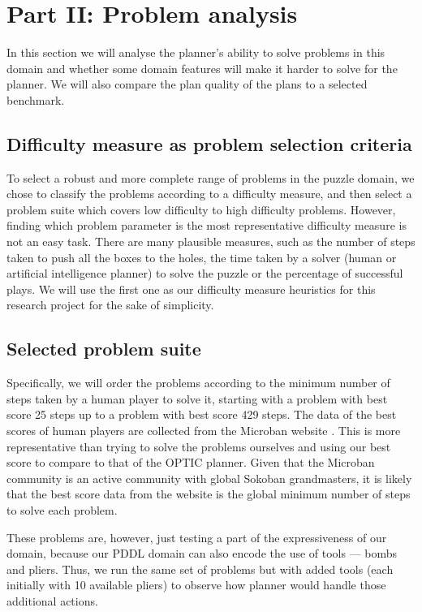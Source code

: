 \documentclass[letterpaper]{article} %
\begin{document}
\section{Part II: Problem analysis}
In this section we will analyse the planner's ability to solve problems in this domain and whether some domain features will
make it harder to solve for the planner. We will also compare the plan quality of the plans to a selected benchmark.

\subsection{Difficulty measure as problem selection criteria}
To select a robust and more complete range of problems in the puzzle domain, we chose to classify the problems according
 to a difficulty measure, and then select a problem suite which covers low difficulty to high difficulty problems. 
 However, finding which problem parameter is the most representative difficulty measure is not an easy task. There are many plausible measures, such as
  the number of steps taken to push all the boxes to the holes, the time taken by a solver (human or artificial 
  intelligence planner) to solve the puzzle or the percentage of successful plays. We will use the first one as our 
  difficulty measure heuristics for this research project for the sake of simplicity.

\subsection{Selected problem suite}
Specifically, we will order the problems according to the
minimum number of steps
taken by a human player to solve it, starting with a 
problem with best score 25 steps up to a problem with 
best score 429 steps. The data of the best scores of
human players are collected from the Microban website \cite{microban}. 
This is more representative than trying to solve the 
problems ourselves and using our best score to compare 
to that of the OPTIC planner. Given that the Microban 
community is an active community with global Sokoban 
grandmasters, it is likely that the best score data 
from the website is the global minimum number of steps
to solve each problem. 
   
These problems are, however, just testing a part of
the expressiveness of our domain, because our PDDL
domain can also encode the use of tools --- 
bombs and pliers. Thus, we run the same set 
of problems but with added tools (each initially 
with 10 available pliers) to observe how planner 
would handle those additional actions.
\end{document}

